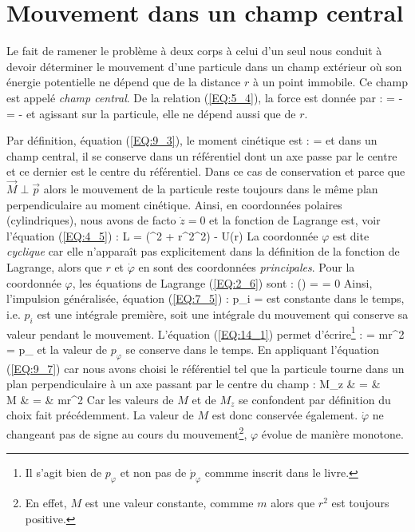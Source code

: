 \section{Mouvement dans un champ central}

Le fait de ramener le probl\`eme \`a deux corps \`a celui d'un seul nous conduit \`a devoir d\'eterminer le mouvement d'une particule dans un champ ext\'erieur o\`u son \'energie potentielle ne d\'epend que de la distance $r$ \`a un point immobile. Ce champ est appel\'e \emph{champ central}. De la relation (\ref{EQ:5_4}), la force est donn\'ee par :
\benn
	 = - = -
\eenn
et agissant sur la particule, elle ne d\'epend aussi que de $r$.

Par d\'efinition, \'equation (\ref{EQ:9_3}), le moment cin\'etique est :
\benn
	 = \wedge{}
\eenn
et dans un champ central, il se conserve dans un r\'ef\'erentiel dont un axe passe par le centre et ce dernier est le centre du r\'ef\'erentiel. Dans ce cas de conservation et parce que $\vec{M}\perp\vec{p}$ alors le mouvement de la particule reste toujours dans le m\^eme plan perpendiculaire au moment cin\'etique. Ainsi, en coordonn\'ees polaires (cylindriques), nous avons de facto $\dot{z} = 0$ et la fonction de Lagrange est, voir l'\'equation (\ref{EQ:4_5}) :
\be
	L = (^{2} + r^{2}\dot{\varphi}^{2}) - U(r) \label{EQ:14_1}
\ee
La coordonn\'ee $\varphi$ est dite \emph{cyclique} car elle n'appara\^it pas explicitement dans la d\'efinition de la fonction de Lagrange, alors que $r$ et $\dot{\varphi}$ en sont des coordonn\'ees \emph{principales}. Pour la coordonn\'ee $\varphi$, les \'equations de Lagrange (\ref{EQ:2_6}) sont :
\benn
	\left(\right) =  = 0
\eenn
Ainsi, l'impulsion g\'en\'eralis\'ee, \'equation (\ref{EQ:7_5}) :
\benn
	p_{i} = 
\eenn
est constante dans le temps, i.e. $p_{i}$ est une int\'egrale premi\`ere, soit une int\'egrale du mouvement qui conserve sa valeur pendant le mouvement. L'\'equation (\ref{EQ:14_1}) permet d'\'ecrire\footnote{Il s'agit bien de $p_{\varphi}$ et non pas de $\dot{p}_{\varphi}$ commme inscrit dans le livre.} :
\benn
	 = mr^{2}\dot{\varphi} = p_{\varphi}
\eenn
et la valeur de $p_{\varphi}$ se conserve dans le temps. En appliquant l'\'equation (\ref{EQ:9_7}) car nous avons choisi le r\'ef\'erentiel tel que la particule tourne dans un plan perpendiculaire \`a un axe passant par le centre du champ :
\bea
	M_{z} & = &  \nonumber \\
	\Leftrightarrow M & = & mr^{2}\dot{\varphi} \label{EQ:14_2}
\eea
Car les valeurs de $M$ et de $M_{z}$ se confondent par d\'efinition du choix fait pr\'ec\'edemment. La valeur de $M$ est donc conserv\'ee \'egalement. $\dot{\varphi}$ ne changeant pas de signe au cours du mouvement\footnote{En effet, $M$ est une valeur constante, commme $m$ alors que $r^{2}$ est toujours positive.}, $\varphi$ \'evolue de mani\`ere monotone.

